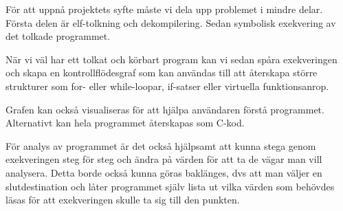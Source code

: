 

För att uppnå projektets syfte måste vi dela upp problemet i mindre
delar. Första delen är elf-tolkning och dekompilering. Sedan symbolisk
exekvering av det tolkade programmet.

När vi väl har ett tolkat och körbart program kan vi sedan spåra
exekveringen och skapa en kontrollflödesgraf som kan användas till att
återskapa större strukturer som for- eller while-loopar, if-satser
eller virtuella funktionsanrop.

Grafen kan också visualiseras för att hjälpa användaren förstå
programmet. Alternativt kan hela programmet återskapas som C-kod.

För analys av programmet är det också hjälpsamt att kunna stega genom
exekveringen steg för steg och ändra på värden för att ta de vägar man
vill analysera. Detta borde också kunna göras baklänges, dvs att man
väljer en slutdestination och låter programmet själv lista ut vilka
värden som behövdes läsas för att exekveringen skulle ta sig till den
punkten.

